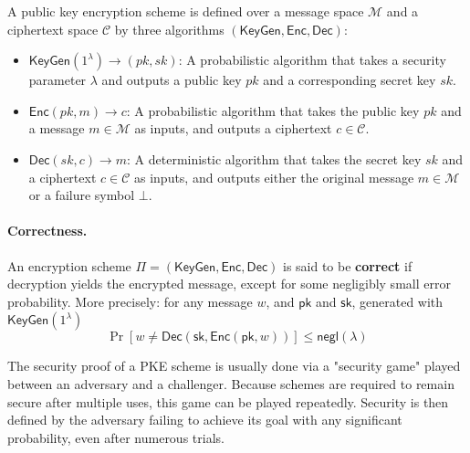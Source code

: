 \begin{itemize}
\begin{definition}
A public key encryption scheme is defined over a message space $\mathcal{M}$ and a ciphertext space $\mathcal{C}$ by three algorithms $(\mathsf{KeyGen}, \mathsf{Enc}, \mathsf{Dec})$:
\begin{itemize}
    \item $\mathsf{KeyGen}(1^\lambda) \to (pk, sk)$: A probabilistic algorithm that takes a security parameter $\lambda$ and outputs a public key $pk$ and a corresponding secret key $sk$.
    \item $\mathsf{Enc}(pk, m) \to c$: A probabilistic algorithm that takes the public key $pk$ and a message $m \in \mathcal{M}$ as inputs, and outputs a ciphertext $c \in \mathcal{C}$.
    \item $\mathsf{Dec}(sk, c) \to m$: A deterministic algorithm that takes the secret key $sk$ and a ciphertext $c \in \mathcal{C}$ as inputs, and outputs either the original message $m \in \mathcal{M}$ or a failure symbol $\bot$.
\end{itemize}
\end{definition}

\paragraph{Correctness.} An encryption scheme $\Pi = (\mathsf{KeyGen}, \mathsf{Enc}, \mathsf{Dec})$ is said to be \textbf{correct} if decryption yields the encrypted message, except for some negligibly small error probability. More precisely: for any message $w$, and $\mathsf{pk}$ and $\mathsf{sk}$, generated with $\mathsf{KeyGen}(1^\lambda)$
\[
\Pr \left[ w \neq \mathsf{Dec}(\mathsf{sk}, \mathsf{Enc}(\mathsf{pk}, w)) \right] \le \mathsf{negl}(\lambda)
\]



The security proof of a PKE scheme is usually done via a "security game" played between an adversary and a challenger. Because schemes are required to remain secure after multiple uses, this game can be played repeatedly. Security is then defined by the adversary failing to achieve its goal with any significant probability, even after numerous trials.


\end{itemize}
